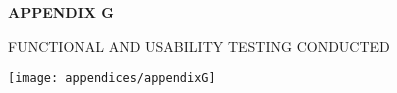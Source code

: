 \begin{center}
	{\bf APPENDIX G}\\[24pt]
\end{center}
{\baselineskip
	
	\begin{center}
		FUNCTIONAL AND USABILITY TESTING CONDUCTED
	\end{center}
	
	\begin{center}
		\texttt{[image: appendices/appendixG]}
	\end{center}
}